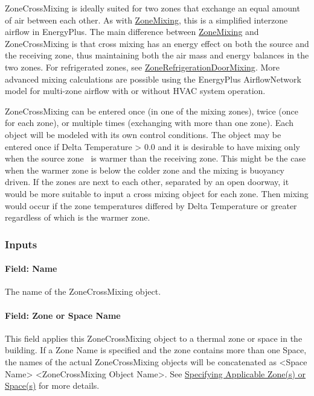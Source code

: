 ZoneCrossMixing is ideally suited for two zones that exchange an equal amount of air between each other. As with \hyperref[zonemixing]{ZoneMixing}, this is a simplified interzone airflow in EnergyPlus. The main difference between \hyperref[zonemixing]{ZoneMixing} and ZoneCrossMixing is that cross mixing has an energy effect on both the source and the receiving zone, thus maintaining both the air mass and energy balances in the two zones. For refrigerated zones, see \hyperref[zonerefrigerationdoormixing]{ZoneRefrigerationDoorMixing}. More advanced mixing calculations are possible using the EnergyPlus AirflowNetwork model for multi-zone airflow with or without HVAC system operation.

ZoneCrossMixing can be entered once (in one of the mixing zones), twice (once for each zone), or multiple times (exchanging with more than one zone). Each object will be modeled with its own control conditions. The object may be entered once if Delta Temperature \textgreater{} 0.0 and it is desirable to have mixing only when the source zone~ is warmer than the receiving zone. This might be the case when the warmer zone is below the colder zone and the mixing is buoyancy driven. If the zones are next to each other, separated by an open doorway, it would be more suitable to input a cross mixing object for each zone. Then mixing would occur if the zone temperatures differed by Delta Temperature or greater regardless of which is the warmer zone.

\subsubsection{Inputs}\label{inputs-6-003}

\paragraph{Field: Name}\label{field-name-6-003}

The name of the ZoneCrossMixing object.

\paragraph{Field: Zone or Space Name}\label{field-zone-name-4}

This field applies this ZoneCrossMixing object to a thermal zone or space in the building. If a Zone Name is specified and the zone contains more than one Space, the names of the actual ZoneCrossMixing objects will be concatenated as \textless{}Space Name\textgreater{} \textless{}ZoneCrossMixing Object Name\textgreater{}. See \hyperref[specifying-applicable-zones-or-spaces]{Specifying Applicable Zone(s) or Space(s)} for more details.

